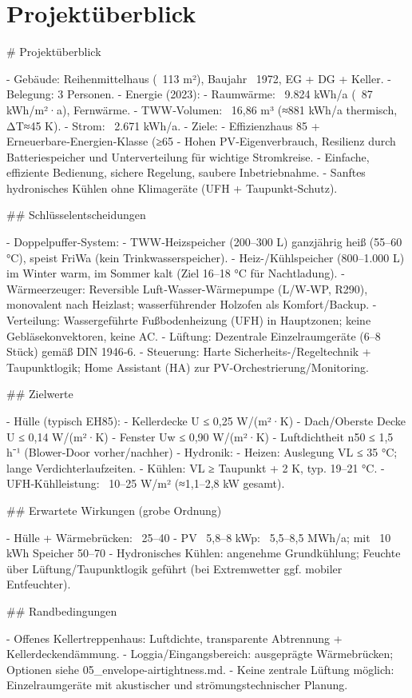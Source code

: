 \documentclass[11pt,oneside]{report}
\begin{document}
\chapter{Projektüberblick}
\begin{markdown}
# Projektüberblick

- Gebäude: Reihenmittelhaus (~113 m²), Baujahr ~1972, EG + DG + Keller.
- Belegung: 3 Personen.
- Energie (2023):
  - Raumwärme: ~9.824 kWh/a (~87 kWh/m²·a), Fernwärme.
  - TWW‑Volumen: ~16,86 m³ (≈881 kWh/a thermisch, ΔT≈45 K).
  - Strom: ~2.671 kWh/a.
- Ziele:
  - Effizienzhaus 85 + Erneuerbare‑Energien‑Klasse (≥65 %
  - Hohen PV‑Eigenverbrauch, Resilienz durch Batteriespeicher und Unterverteilung für wichtige Stromkreise.
  - Einfache, effiziente Bedienung, sichere Regelung, saubere Inbetriebnahme.
  - Sanftes hydronisches Kühlen ohne Klimageräte (UFH + Taupunkt‑Schutz).

## Schlüsselentscheidungen

- Doppelpuffer‑System:
  - TWW‑Heizspeicher (200–300 L) ganzjährig heiß (55–60 °C), speist FriWa (kein Trinkwasserspeicher).
  - Heiz-/Kühlspeicher (800–1.000 L) im Winter warm, im Sommer kalt (Ziel 16–18 °C für Nachtladung).
- Wärmeerzeuger: Reversible Luft‑Wasser‑Wärmepumpe (L/W‑WP, R290), monovalent nach Heizlast; wasserführender Holzofen als Komfort/Backup.
- Verteilung: Wassergeführte Fußbodenheizung (UFH) in Hauptzonen; keine Gebläsekonvektoren, keine AC.
- Lüftung: Dezentrale Einzelraumgeräte (6–8 Stück) gemäß DIN 1946‑6.
- Steuerung: Harte Sicherheits‑/Regeltechnik + Taupunktlogik; Home Assistant (HA) zur PV‑Orchestrierung/Monitoring.

## Zielwerte

- Hülle (typisch EH85):
  - Kellerdecke U ≤ 0,25 W/(m²·K)
  - Dach/Oberste Decke U ≤ 0,14 W/(m²·K)
  - Fenster Uw ≤ 0,90 W/(m²·K)
  - Luftdichtheit n50 ≤ 1,5 h⁻¹ (Blower‑Door vorher/nachher)
- Hydronik:
  - Heizen: Auslegung VL ≤ 35 °C; lange Verdichterlaufzeiten.
  - Kühlen: VL ≥ Taupunkt + 2 K, typ. 19–21 °C.
  - UFH‑Kühlleistung: ~10–25 W/m² (≈1,1–2,8 kW gesamt).

## Erwartete Wirkungen (grobe Ordnung)

- Hülle + Wärmebrücken: ~25–40 %
- PV ~5,8–8 kWp: ~5,5–8,5 MWh/a; mit ~10 kWh Speicher 50–70 %
- Hydronisches Kühlen: angenehme Grundkühlung; Feuchte über Lüftung/Taupunktlogik geführt (bei Extremwetter ggf. mobiler Entfeuchter).

## Randbedingungen

- Offenes Kellertreppenhaus: Luftdichte, transparente Abtrennung + Kellerdeckendämmung.
- Loggia/Eingangsbereich: ausgeprägte Wärmebrücken; Optionen siehe 05_envelope-airtightness.md.
- Keine zentrale Lüftung möglich: Einzelraumgeräte mit akustischer und strömungstechnischer Planung.
\end{markdown}
\end{document}
